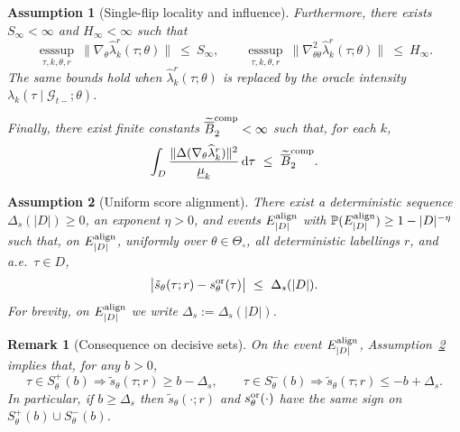 \documentclass{statsoc}
\newtheorem{assumption}[assumption]{Assumption}
\newtheorem{remark}[remark]{Remark}
\newcommand{\dd}{\mathrm{d}}
\newcommand{\1}{\mathbbm{1}}
\begin{document}
\begin{assumption}[Single-flip locality and influence]
Furthermore, there exists $S_\infty<\infty$ and $H_\infty < \infty$ such that
\[
\operatorname*{ess sup}_{\tau,k,\theta,r}\ \|\nabla_\theta \widehat\lambda_k^r(\tau;\theta)\|\ \le\ S_\infty,
\qquad
\operatorname*{ess sup}_{\tau,k,\theta,r}\ \|\nabla^2_{\theta\theta} \widehat\lambda_k^r(\tau;\theta)\|\ \le\ H_\infty.
\]
The same bounds hold when $\widehat\lambda_k^r(\tau;\theta)$ is replaced by the oracle intensity
$\lambda_k(\tau\mid\mathcal G_{t-};\theta)$.

Finally, there exist finite constants $\widetilde{\overline B}_2^{\rm comp}<\infty$ such that, for each $k$,
\[
\int_D \frac{\|\Delta(\nabla_\theta \widehat\lambda_k^r)\|^2}{\underline\mu_k}\,\dd\tau \ \le\ \widetilde{\overline B}_2^{\rm comp}.
\]
\end{assumption}

\begin{assumption}[Uniform score alignment]\label{ass:G4}
There exist a deterministic sequence \(\Delta_s(|D|)\ge 0\), an exponent \(\eta>0\), and events
\(E^{\rm align}_{|D|}\) with \(\mathbb P(E^{\rm align}_{|D|})\ge 1-|D|^{-\eta}\) such that, on \(E^{\rm align}_{|D|}\), uniformly over \(\theta\in\Theta_\circ\), all deterministic labellings \(r\), and a.e.\ \(\tau\in D\),
\[
\big|\tilde s_\theta(\tau;r)-s^{\rm or}_\theta(\tau)\big|\ \le\ \Delta_s(|D|).
\]
For brevity, on \(E^{\rm align}_{|D|}\) we write \(\Delta_s:=\Delta_s(|D|)\).
\end{assumption}

\begin{remark}[Consequence on decisive sets]
On the event \(E^{\rm align}_{|D|}\), Assumption~\ref{ass:G4} implies that, for any \(b>0\),
\[
\tau\in S_\theta^+(b)\Rightarrow \tilde s_\theta(\tau;r)\ge b-\Delta_s,
\qquad
\tau\in S_\theta^-(b)\Rightarrow \tilde s_\theta(\tau;r)\le -b+\Delta_s.
\]
In particular, if \(b\ge \Delta_s\) then \(\tilde s_\theta(\cdot;r)\) and \(s_\theta^{\rm or}(\cdot)\) have the same sign
on \(S_\theta^+(b)\cup S_\theta^-(b)\).
\end{remark}
\end{document}
